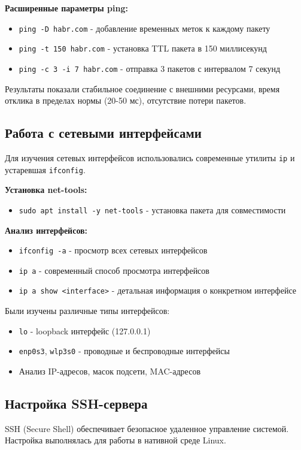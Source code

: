 \textbf{Расширенные параметры ping:}
\begin{itemize}
    \item \texttt{ping -D habr.com} - добавление временных меток к каждому пакету
    \item \texttt{ping -t 150 habr.com} - установка TTL пакета в 150 миллисекунд
    \item \texttt{ping -c 3 -i 7 habr.com} - отправка 3 пакетов с интервалом 7 секунд
\end{itemize}

Результаты показали стабильное соединение с внешними ресурсами, время отклика в пределах нормы (20-50 мс), отсутствие потери пакетов.

\subsection{Работа с сетевыми интерфейсами}
Для изучения сетевых интерфейсов использовались современные утилиты \texttt{ip} и устаревшая \texttt{ifconfig}.

\textbf{Установка net-tools:}
\begin{itemize}
    \item \texttt{sudo apt install -y net-tools} - установка пакета для совместимости
\end{itemize}

\textbf{Анализ интерфейсов:}
\begin{itemize}
    \item \texttt{ifconfig -a} - просмотр всех сетевых интерфейсов
    \item \texttt{ip a} - современный способ просмотра интерфейсов
    \item \texttt{ip a show <interface>} - детальная информация о конкретном интерфейсе
\end{itemize}

Были изучены различные типы интерфейсов:
\begin{itemize}
    \item \texttt{lo} - loopback интерфейс (127.0.0.1)
    \item \texttt{enp0s3}, \texttt{wlp3s0} - проводные и беспроводные интерфейсы
    \item Анализ IP-адресов, масок подсети, MAC-адресов
\end{itemize}

\subsection{Настройка SSH-сервера}
SSH (Secure Shell) обеспечивает безопасное удаленное управление системой. Настройка выполнялась для работы в нативной среде Linux.

